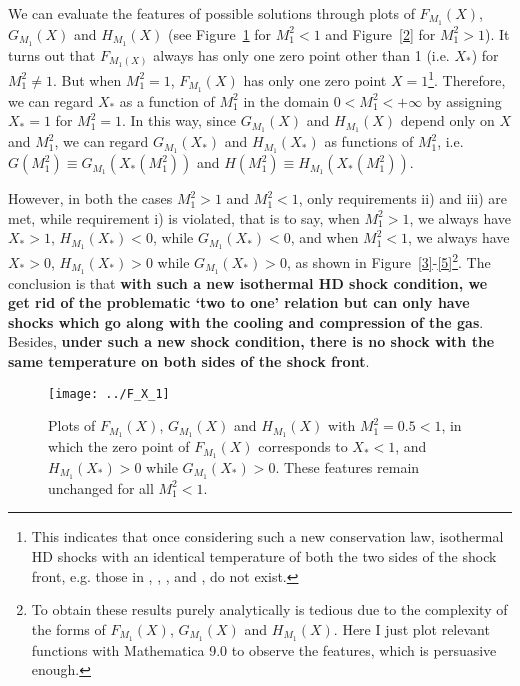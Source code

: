 \documentclass[fleqn,usenatbib]{mnras}
\begin{document}
We can evaluate the features of possible solutions through plots of $F_{M_{1}}(X)$, $G_{M_{1}}(X)$ and $H_{M_{1}}(X)$ (see Figure~\ref{1} for $M_{1}^{2}<1$ and Figure~\ref{2} for $M_{1}^{2}>1$). It turns out that $F_{M_{1}(X)}$ always has only one zero point other than 1 (i.e. $X_{*}$) for $M_{1}^{2}\neq 1$. But when $M_{1}^{2}=1$, $F_{M_{1}}(X)$ has only one zero point $X=1$\footnote{This indicates that once considering such a new conservation law, isothermal HD shocks with an identical temperature of both the two sides of the shock front, e.g. those in \citet{spitzer}, \citet{shen2004shocked}, \cite{bian2005spherical}, \citet{lou2009dynamic} and \citet{lou2014self}, do not exist.}. Therefore, we can regard $X_{*}$ as a function of $M_{1}^{2}$ in the domain $0<M_{1}^{2}<+\infty$ by assigning $X_{*}=1$ for $M_{1}^{2}=1$. In this way, since $G_{M_{1}}(X)$ and $H_{M_{1}}(X)$ depend only on $X$ and $M_{1}^{2}$, we can regard $G_{M_{1}}(X_{*})$ and $H_{M_{1}}(X_{*})$ as functions of $M_{1}^{2}$, i.e. $G(M_{1}^{2})\equiv G_{M_{1}}(X_{*}(M_{1}^{2}))$ and $H(M_{1}^{2})\equiv H_{M_{1}}(X_{*}(M_{1}^{2}))$.

However, in both the cases $M_{1}^{2}>1$ and $M_{1}^{2}<1$, only requirements ii) and iii) are met, while requirement i) is violated, that is to say, when $M_{1}^{2}>1$, we always have $X_{*}>1$, $H_{M_{1}}(X_{*})<0$, while $G_{M_{1}}(X_{*})<0$, and when $M_{1}^{2}<1$, we always have $X_{*}>0$, $H_{M_{1}}(X_{*})>0$ while $G_{M_{1}}(X_{*})>0$, as shown in Figure~\ref{3}-\ref{5}\footnote{To obtain these results purely analytically is tedious due to the complexity of the forms of $F_{M_{1}}(X)$, $G_{M_{1}}(X)$ and $H_{M_{1}}(X)$. Here I just plot relevant functions with Mathematica 9.0 to observe the features, which is persuasive enough.}. The conclusion is that \textbf{with such a new isothermal HD shock condition, we get rid of the problematic `two to one' relation but can only have shocks which go along with the cooling and compression of the gas}. Besides, \textbf{under such a new shock condition, there is no shock with the same temperature on both sides of the shock front}.
\begin{figure}
\centering
\texttt{[image: ../F\_X\_1]}
\caption{Plots of $F_{M_{1}}(X)$, $G_{M_{1}}(X)$ and $H_{M_{1}}(X)$ with $M_{1}^{2}=0.5<1$, in which the zero point of $F_{M_{1}}(X)$ corresponds to $X_{*}<1$, and $H_{M_{1}}(X_{*})>0$ while $G_{M_{1}}(X_{*})>0$. These features remain unchanged for all $M_{1}^{2}<1$.}
\label{1}
\end{figure}
\end{document}
